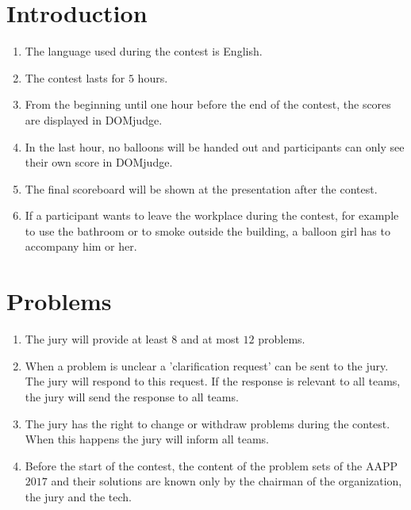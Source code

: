 \documentclass[11pt]{report}
\begin{document}
\section{Introduction}
\begin{enumerate}[label=\bfseries 4.1.\arabic*]
\item The language used during the contest is English.
\item The contest lasts for $5$ hours.
\item From the beginning until one hour before the end of the contest, the scores are displayed in DOMjudge.
\item In the last hour, no balloons will be handed out and participants can only see their own score in DOMjudge.
\item The final scoreboard will be shown at the presentation after the contest. %
\item \label{leaveTheWorkplace} If a participant wants to leave the workplace during the contest, for example to use the bathroom or to smoke outside the building, a balloon girl has to accompany him or her.
\end{enumerate}

\section{Problems}
\begin{enumerate}[label=\bfseries 4.2.\arabic*]
\item The jury will provide at least $8$ and at most $12$ problems.
\item When a problem is unclear a 'clarification request' can be sent to the jury. The jury will respond to this request. If the response is relevant to all teams, the jury will send the response to all teams.
\item The jury has the right to change or withdraw problems during the contest. When this happens the jury will inform all teams.
\item \label{content} Before the start of the contest, the content of the problem sets of the AAPP $2017$ and their solutions are known only by the chairman of the organization, the jury and the tech.
\end{enumerate}
\end{document}

